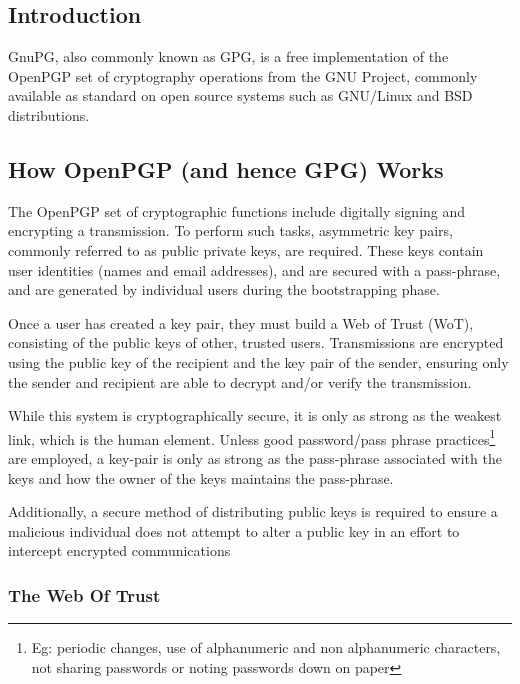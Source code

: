 
\subsection{Introduction}

GnuPG, also commonly known as GPG, is a free implementation of the
OpenPGP set of cryptography operations from the GNU Project, commonly
available as standard on open source systems such as GNU/Linux and BSD 
distributions.

\subsection{How OpenPGP (and hence GPG) Works}

The OpenPGP set of cryptographic functions include digitally signing and
encrypting a transmission. To perform such tasks, asymmetric key pairs,
commonly referred to as public private keys, are required. These keys
contain user identities (names and email addresses), and are secured 
with a pass-phrase, and are generated by individual users during the 
bootstrapping phase.


Once a user has created a key pair, they must build a Web of Trust 
(WoT), consisting of the public keys of other, trusted users.
Transmissions are encrypted using the public key of the recipient and
the key pair of the sender, ensuring only the sender and recipient are
able to decrypt and/or verify the transmission.


While this system is cryptographically secure, it is only as strong as
the weakest link, which is the human element. Unless 
good password/pass phrase practices\footnote{Eg: periodic changes, use 
of alphanumeric and non alphanumeric characters, not sharing passwords 
or noting passwords down on paper} are employed, a key-pair is only as 
strong as the pass-phrase associated with the keys and how the owner of 
the keys maintains the pass-phrase.


Additionally, a secure method of distributing public keys is required to
ensure a malicious individual does not attempt to alter a public key in
an effort to intercept encrypted communications

\subsubsection{The Web Of Trust}

